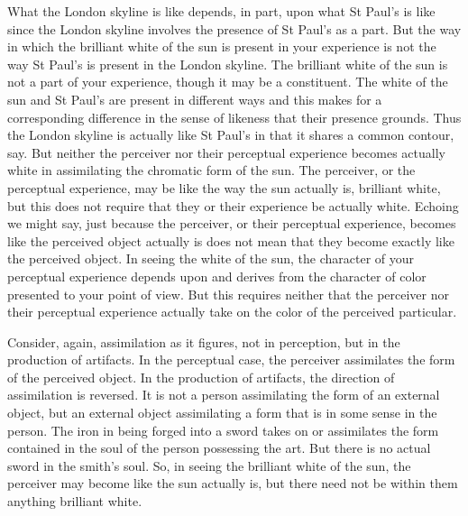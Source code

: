 What the London skyline is like depends, in part, upon what St Paul's is like since the London skyline involves the presence of St Paul's as a part. But the way in which the brilliant white of the sun is present in your experience is not the way St Paul's is present in the London skyline. The brilliant white of the sun is not a part of your experience, though it may be a constituent. The white of the sun and St Paul's are present in different ways and this makes for a corresponding difference in the sense of likeness that their presence grounds. Thus the London skyline is actually like St Paul's in that it shares a common contour, say. But neither the perceiver nor their perceptual experience becomes actually white in assimilating the chromatic form of the sun. The perceiver, or the perceptual experience, may be like the way the sun actually is, brilliant white, but this does not require that they or their experience be actually white. Echoing \citet{Austin:1962lr} we might say, just because the perceiver, or their perceptual experience, becomes like the perceived object actually is does not mean that they become exactly like the perceived object. In seeing the white of the sun, the character of your perceptual experience depends upon and derives from the character of color presented to your point of view. But this requires neither that the perceiver nor their perceptual experience actually take on the color of the perceived particular.

Consider, again, assimilation as it figures, not in perception, but in the production of artifacts. In the perceptual case, the perceiver assimilates the form of the perceived object. In the production of artifacts, the direction of assimilation is reversed. It is not a person assimilating the form of an external object, but an external object assimilating a form that is in some sense in the person. The iron in being forged into a sword takes on or assimilates the form contained in the soul of the person possessing the art.  But there is no actual sword in the smith’s soul. So, in seeing the brilliant white of the sun, the perceiver may become like the sun actually is, but there need not be within them anything brilliant white.

